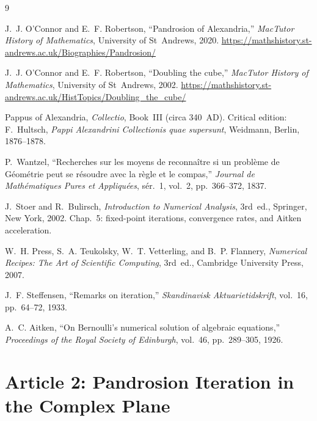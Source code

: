 \documentclass[10pt,a4paper,oneside]{book}
\theoremstyle{definition}
\theoremstyle{remark}
\begin{document}
\begin{thebibliography}{9}

J.~J. O'Connor and E.~F. Robertson,
``Pandrosion of Alexandria,''
\textit{MacTutor History of Mathematics}, University of St~Andrews, 2020.
\url{https://mathshistory.st-andrews.ac.uk/Biographies/Pandrosion/}

J.~J. O'Connor and E.~F. Robertson,
``Doubling the cube,''
\textit{MacTutor History of Mathematics}, University of St~Andrews, 2002.
\url{https://mathshistory.st-andrews.ac.uk/HistTopics/Doubling_the_cube/}

Pappus of Alexandria,
\textit{Collectio}, Book~III (circa 340~AD).
Critical edition: F.~Hultsch, \textit{Pappi Alexandrini Collectionis quae supersunt},
Weidmann, Berlin, 1876--1878.

P.~Wantzel,
``Recherches sur les moyens de reconna\^itre si un probl\`eme de G\'eom\'etrie peut se r\'esoudre avec la r\`egle et le compas,''
\textit{Journal de Math\'ematiques Pures et Appliqu\'ees}, s\'er.~1, vol.~2, pp.~366--372, 1837.

J.~Stoer and R.~Bulirsch,
\textit{Introduction to Numerical Analysis},
3rd~ed., Springer, New York, 2002.
Chap.~5: fixed-point iterations, convergence rates, and Aitken acceleration.

W.~H. Press, S.~A. Teukolsky, W.~T. Vetterling, and B.~P. Flannery,
\textit{Numerical Recipes: The Art of Scientific Computing},
3rd~ed., Cambridge University Press, 2007.

J.~F. Steffensen,
``Remarks on iteration,''
\textit{Skandinavisk Aktuarietidskrift}, vol.~16, pp.~64--72, 1933.

A.~C. Aitken,
``On Bernoulli's numerical solution of algebraic equations,''
\textit{Proceedings of the Royal Society of Edinburgh}, vol.~46, pp.~289--305, 1926.

\end{thebibliography}





\chapter{Article 2: Pandrosion Iteration in the Complex Plane}
\graphicspath{{../}{../../figures/}{../smale/figures/}}
\end{document}
